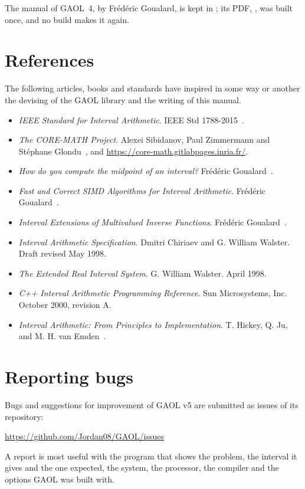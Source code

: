 \noindent
The manual of GAOL~4, by Fr\'ed\'eric Goualard, is kept in ; its
PDF, , was built once, and no build makes it
again.

\section{References}

The following articles, books and standards have inspired in some way or
another the devising of the GAOL library and the writing of this manual.

\begin{itemize}
\item \emph{IEEE Standard for Interval Arithmetic}. IEEE Std
  1788-2015~\cite{IEEE1788:2015}.
\item \emph{The CORE-MATH Project}. Alexei Sibidanov, Paul Zimmermann and
  St\'ephane Glondu~\cite{CoreMath:2022}, and
  \url{https://core-math.gitlabpages.inria.fr/}.
\item \emph{How do you compute the midpoint of an interval?} Fr\'ed\'eric
  Goualard~\cite{Goualard:TOMS2014}.
\item \emph{Fast and Correct SIMD Algorithms for Interval Arithmetic}.
  Fr\'ed\'eric Goualard~\cite{Goualard:PARA08}.
\item \emph{Interval Extensions of Multivalued Inverse Functions}.
  Fr\'ed\'eric Goualard~\cite{Goualard:2008}.
\item \emph{Interval Arithmetic Specification}. Dmitri Chiriaev and G.\:
  William Walster. Draft revised May 1998.
\item \emph{The Extended Real Interval System}. G.\: William Walster. April
  1998.
\item \emph{C++ Interval Arithmetic Programming Reference}. Sun Microsystems,
  Inc. October 2000, revision A.
\item \emph{Interval Arithmetic: From Principles to Implementation}. T.\:
  Hickey, Q.\: Ju, and M.\: H.\: van Emden~\cite{Hickey-Ju-vanEmden:2001}.
\end{itemize}

\section{Reporting bugs}

Bugs and suggestions for improvement of GAOL v5 are submitted as issues
of its repository:

\begin{center}
  \url{https://github.com/Jordan08/GAOL/issues}
\end{center}

\noindent
A report is most useful with the program that shows the problem, the
interval it gives and the one expected, the system, the processor, the
compiler and the options GAOL was built with.
